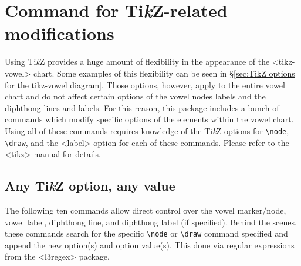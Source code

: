 \documentclass{article}
\newcommand{\pkg}[1]{\texttt{#1}}
\newcommand{\TikZ}{Ti\textit{k}Z\xspace}
\def\texttt#1{<#1>}%
\begin{document}
\section{Command for \TikZ-related modifications}
\label{sec:Command for TikZ-related modifications}

Using \TikZ provides a huge amount of flexibility in the appearance of the \texttt{tikz-vowel} chart.  Some examples of this flexibility can be seen in \S \ref{sec:TikZ options for the tikz-vowel diagram}.  Those options, however, apply to the entire vowel chart and do not affect certain options of the vowel nodes labels and the diphthong lines and labels.  For this reason, this package includes a bunch of commands which modify specific options of the elements within the vowel chart.  Using all of these commands requires knowledge of the \TikZ options for \verb|\node|, \verb|\draw|, and the \texttt{label} option for each of these commands.  Please refer to the \pkg{tikz} manual for details.

\subsection{Any \TikZ option, any value}
\label{sec:Any TikZ option, any value}

The following ten commands allow direct control over the vowel marker/node, vowel label, diphthong line, and diphthong label (if specified).  Behind the scenes, these commands search for the specific \verb|\node| or \verb|\draw| command specified and append the new option(s) and option value(s).  This done via regular expressions from the \pkg{l3regex} package.
\end{document}
